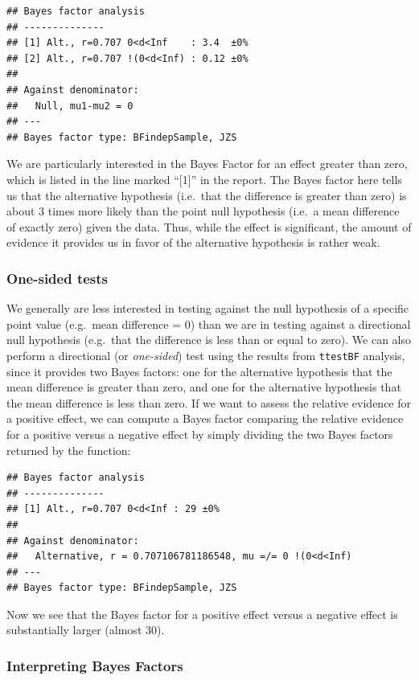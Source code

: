 \documentclass[12pt,]{book}
\theoremstyle{definition}
\theoremstyle{definition}
\theoremstyle{definition}
\theoremstyle{remark}
\begin{document}
\begin{verbatim}
## Bayes factor analysis
## --------------
## [1] Alt., r=0.707 0<d<Inf    : 3.4  ±0%
## [2] Alt., r=0.707 !(0<d<Inf) : 0.12 ±0%
## 
## Against denominator:
##   Null, mu1-mu2 = 0 
## ---
## Bayes factor type: BFindepSample, JZS
\end{verbatim}

We are particularly interested in the Bayes Factor for an effect greater than zero, which is listed in the line marked ``{[}1{]}'' in the report. The Bayes factor here tells us that the alternative hypothesis (i.e.~that the difference is greater than zero) is about 3 times more likely than the point null hypothesis (i.e.~a mean difference of exactly zero) given the data. Thus, while the effect is significant, the amount of evidence it provides us in favor of the alternative hypothesis is rather weak.

\hypertarget{one-sided-tests}{%
\subsubsection{One-sided tests}\label{one-sided-tests}}

We generally are less interested in testing against the null hypothesis of a specific point value (e.g.~mean difference = 0) than we are in testing against a directional null hypothesis (e.g.~that the difference is less than or equal to zero). We can also perform a directional (or \emph{one-sided}) test using the results from \texttt{ttestBF} analysis, since it provides two Bayes factors: one for the alternative hypothesis that the mean difference is greater than zero, and one for the alternative hypothesis that the mean difference is less than zero. If we want to assess the relative evidence for a positive effect, we can compute a Bayes factor comparing the relative evidence for a positive versus a negative effect by simply dividing the two Bayes factors returned by the function:

\begin{verbatim}
## Bayes factor analysis
## --------------
## [1] Alt., r=0.707 0<d<Inf : 29 ±0%
## 
## Against denominator:
##   Alternative, r = 0.707106781186548, mu =/= 0 !(0<d<Inf) 
## ---
## Bayes factor type: BFindepSample, JZS
\end{verbatim}

Now we see that the Bayes factor for a positive effect versus a negative effect is substantially larger (almost 30).

\hypertarget{interpreting-bayes-factors}{%
\subsubsection{Interpreting Bayes Factors}\label{interpreting-bayes-factors}}
\end{document}
